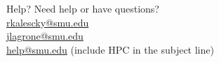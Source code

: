 \begin{frame}{Help?}
\centering
Need help or have questions?\\
\href{mailto:rkalescky@smu.edu}{rkalescky@smu.edu} \\
\href{mailto:jlagrone@smu.edu}{jlagrone@smu.edu} \\
\href{mailto:help@smu.edu}{help@smu.edu}  (include HPC in the subject line)
\end{frame}

